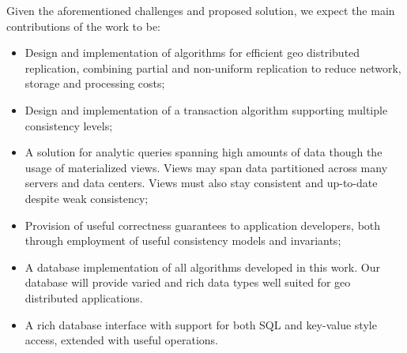 Given the aforementioned challenges and proposed solution, we expect the main contributions of the work to be:

\begin{itemize}
	\item Design and implementation of algorithms for efficient geo distributed replication, combining partial and non-uniform replication to reduce network, storage and processing costs;
	\item Design and implementation of a transaction algorithm supporting multiple consistency levels;
	\item A solution for analytic queries spanning high amounts of data though the usage of materialized views.
	Views may span data partitioned across many servers and data centers.
	Views must also stay consistent and up-to-date despite weak consistency;
	\item Provision of useful correctness guarantees to application developers, both through employment of useful consistency models and invariants;%
	\item A database implementation of all algorithms developed in this work. Our database will provide varied and rich data types well suited for geo distributed applications.
	\item A rich database interface with support for both SQL and key-value style access, extended with useful operations. %
\end{itemize}



